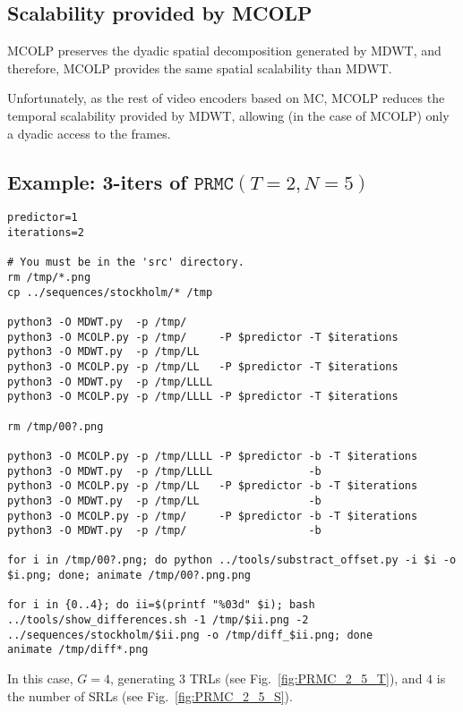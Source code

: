 
\subsection{Scalability provided by MCOLP}

MCOLP preserves the dyadic spatial decomposition generated by MDWT,
and therefore, MCOLP provides the same spatial scalability than MDWT.

Unfortunately, as the rest of video encoders based on MC, MCOLP
reduces the temporal scalability provided by MDWT, allowing (in the
case of MCOLP) only a dyadic access to the frames.


\subsection{Example: 3-iters of $\mathtt{PRMC}(T=2, N=5)$}

\begin{verbatim}
predictor=1
iterations=2

# You must be in the 'src' directory.
rm /tmp/*.png
cp ../sequences/stockholm/* /tmp

python3 -O MDWT.py  -p /tmp/
python3 -O MCOLP.py -p /tmp/     -P $predictor -T $iterations
python3 -O MDWT.py  -p /tmp/LL
python3 -O MCOLP.py -p /tmp/LL   -P $predictor -T $iterations
python3 -O MDWT.py  -p /tmp/LLLL
python3 -O MCOLP.py -p /tmp/LLLL -P $predictor -T $iterations

rm /tmp/00?.png

python3 -O MCOLP.py -p /tmp/LLLL -P $predictor -b -T $iterations
python3 -O MDWT.py  -p /tmp/LLLL               -b
python3 -O MCOLP.py -p /tmp/LL   -P $predictor -b -T $iterations
python3 -O MDWT.py  -p /tmp/LL                 -b
python3 -O MCOLP.py -p /tmp/     -P $predictor -b -T $iterations
python3 -O MDWT.py  -p /tmp/                   -b

for i in /tmp/00?.png; do python ../tools/substract_offset.py -i $i -o $i.png; done; animate /tmp/00?.png.png

for i in {0..4}; do ii=$(printf "%03d" $i); bash ../tools/show_differences.sh -1 /tmp/$ii.png -2 ../sequences/stockholm/$ii.png -o /tmp/diff_$ii.png; done
animate /tmp/diff*.png
\end{verbatim}

In this case, $G=4$, generating $3$ TRLs (see
Fig.~\ref{fig:PRMC_2_5_T}), and $4$ is the number of SRLs (see
Fig.~\ref{fig:PRMC_2_5_S}).

